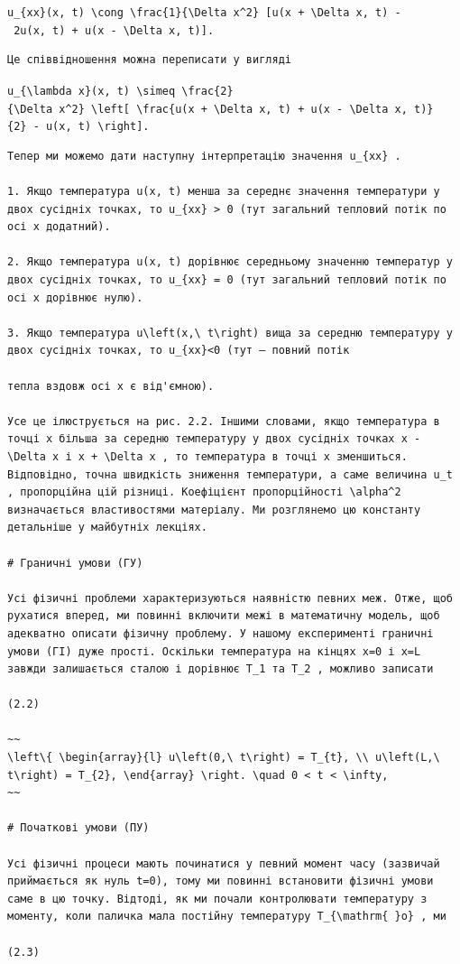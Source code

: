 \documentclass[
  ukrainian,
]{article}
\begin{document}
\texttt{u\_\{xx\}(x,\ t)\ \textbackslash{}cong\ \textbackslash{}frac\{1\}\{\textbackslash{}Delta\ x\^{}2\}\ {[}u(x\ +\ \textbackslash{}Delta\ x,\ t)\ -\ 2u(x,\ t)\ +\ u(x\ -\ \textbackslash{}Delta\ x,\ t){]}.}

\begin{verbatim}
Це співвідношення можна переписати у вигляді
\end{verbatim}

\texttt{u\_\{\textbackslash{}lambda\ x\}(x,\ t)\ \textbackslash{}simeq\ \textbackslash{}frac\{2\}\{\textbackslash{}Delta\ x\^{}2\}\ \textbackslash{}left{[}\ \textbackslash{}frac\{u(x\ +\ \textbackslash{}Delta\ x,\ t)\ +\ u(x\ -\ \textbackslash{}Delta\ x,\ t)\}\{2\}\ -\ u(x,\ t)\ \textbackslash{}right{]}.}

\begin{verbatim}
Тепер ми можемо дати наступну інтерпретацію значення u_{xx} .

1. Якщо температура u(x, t) менша за середнє значення температури у двох сусідніх точках, то u_{xx} > 0 (тут загальний тепловий потік по осі x додатний).

2. Якщо температура u(x, t) дорівнює середньому значенню температур у двох сусідніх точках, то u_{xx} = 0 (тут загальний тепловий потік по осі x дорівнює нулю).

3. Якщо температура u\left(x,\ t\right) вища за середню температуру у двох сусідніх точках, то u_{xx}<0 (тут — повний потік

тепла вздовж осі x є від'ємною).

Усе це ілюструється на рис. 2.2. Іншими словами, якщо температура в точці x більша за середню температуру у двох сусідніх точках x - \Delta x і x + \Delta x , то температура в точці x зменшиться. Відповідно, точна швидкість зниження температури, а саме величина u_t , пропорційна цій різниці. Коефіцієнт пропорційності \alpha^2 визначається властивостями матеріалу. Ми розглянемо цю константу детальніше у майбутніх лекціях.

# Граничні умови (ГУ)

Усі фізичні проблеми характеризуються наявністю певних меж. Отже, щоб рухатися вперед, ми повинні включити межі в математичну модель, щоб адекватно описати фізичну проблему. У нашому експерименті граничні умови (ГІ) дуже прості. Оскільки температура на кінцях x=0 і x=L завжди залишається сталою і дорівнює T_1 та T_2 , можливо записати

(2.2)

~~
\left\{ \begin{array}{l} u\left(0,\ t\right) = T_{t}, \\ u\left(L,\ t\right) = T_{2}, \end{array} \right. \quad 0 < t < \infty,
~~

# Початкові умови (ПУ)

Усі фізичні процеси мають починатися у певний момент часу (зазвичай приймається як нуль t=0), тому ми повинні встановити фізичні умови саме в цю точку. Відтоді, як ми почали контролювати температуру з моменту, коли паличка мала постійну температуру T_{\mathrm{ }o} , ми

(2.3)
\end{verbatim}
\end{document}
